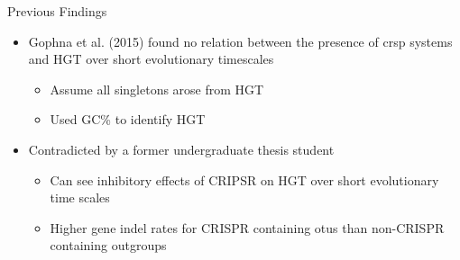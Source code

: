 \documentclass[dvipsnames]{beamer}
\begin{document}
\begin{frame}[fragile]{Previous Findings}
    \begin{itemize}
        \item<2-> Gophna et al. (2015) found no relation between the presence of \ac{crsp} systems and HGT over short evolutionary timescales
        \begin{itemize}
            \item<3-> Assume all singletons arose from HGT
            \item<4-> Used GC\% to identify HGT
        \end{itemize}
        \item<5-> Contradicted by a former undergraduate thesis student
        \begin{itemize}
            \item<6-> Can see inhibitory effects of CRIPSR on HGT over short evolutionary time scales
            \item<7-> Higher gene indel rates for CRISPR containing \ac{otu}s than non-CRISPR containing outgroups
        \end{itemize}
    \end{itemize}
\end{frame}
\end{document}
